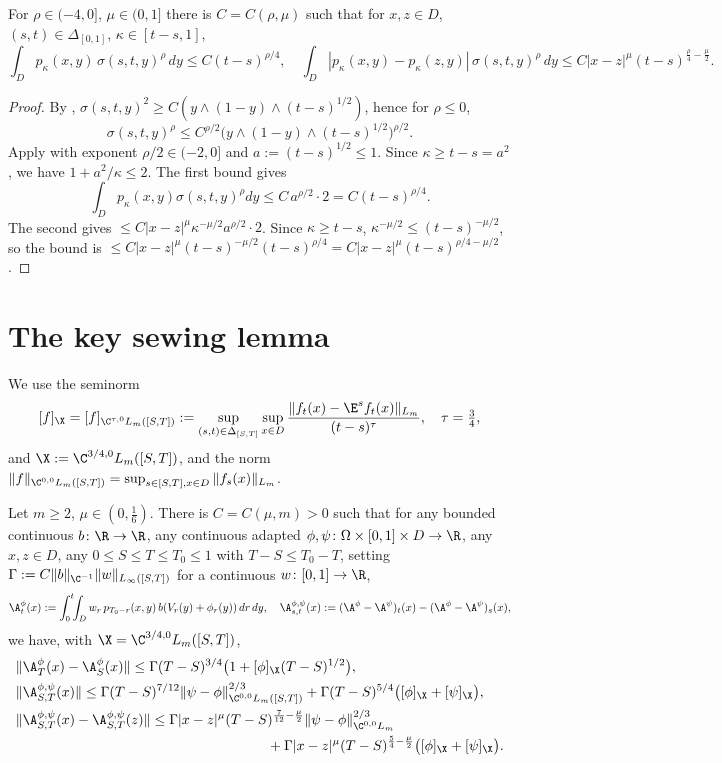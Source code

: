 \begin{corollary}\label{c:key}
For $\rho\in(-4,0]$, $\mu\in(0,1]$ there is $C=C(\rho,\mu)$ such that for $x,z\in D$, $(s,t)\in\Delta_{[0,1]}$, $\kappa\in[t-s,1]$,
\[
\int_D p_\kappa(x,y)\,\sigma(s,t,y)^\rho\,dy\le C(t-s)^{\rho/4},
\quad
\int_D|p_\kappa(x,y)-p_\kappa(z,y)|\,\sigma(s,t,y)^\rho\,dy\le C|x-z|^\mu(t-s)^{\frac\rho4-\frac\mu2}.
\]
\end{corollary}

\begin{proof}
By , $\sigma(s,t,y)^2\ge C(y\wedge(1-y)\wedge(t-s)^{1/2})$, hence for $\rho\le0$,
\[
\sigma(s,t,y)^\rho\le C^{\rho/2}\big(y\wedge(1-y)\wedge(t-s)^{1/2}\big)^{\rho/2}.
\]
Apply  with exponent $\rho/2\in(-2,0]$ and $a:=(t-s)^{1/2}\le 1$. Since $\kappa\ge t-s=a^2$, we have $1+a^2/\kappa\le 2$. The first bound gives
\[
\int_D p_\kappa(x,y)\sigma(s,t,y)^\rho dy\le C\,a^{\rho/2}\cdot 2=C(t-s)^{\rho/4}.
\]
The second gives $\le C|x-z|^\mu\kappa^{-\mu/2}a^{\rho/2}\cdot 2$. Since $\kappa\ge t-s$, $\kappa^{-\mu/2}\le (t-s)^{-\mu/2}$, so the bound is $\le C|x-z|^\mu(t-s)^{-\mu/2}(t-s)^{\rho/4}=C|x-z|^\mu(t-s)^{\rho/4-\mu/2}$.
\end{proof}

\section{The key sewing lemma}

We use the seminorm
\[
[f]_{\X}=[f]_{\C^{\tau,0}L_m([S,T])}:=\sup_{(s,t)\in\Delta_{[S,T]}}\sup_{x\in D}\frac{\|f_t(x)-\E^s f_t(x)\|_{L_m}}{(t-s)^\tau},\quad \tau=\tfrac34,
\]
and $\X:=\C^{3/4,0}L_m([S,T])$, and the norm $\|f\|_{\C^{0,0}L_m([S,T])}=\sup_{s\in[S,T],x\in D}\|f_s(x)\|_{L_m}$.

\begin{lemma}\label{L26}
Let $m\ge2$, $\mu\in(0,\tfrac16)$. There is $C=C(\mu,m)>0$ such that for any bounded continuous $b\colon\R\to\R$, any continuous adapted $\phi,\psi\colon\Omega\times[0,1]\times D\to\R$, any $x,z\in D$, any $0\le S\le T\le T_0\le1$ with $T-S\le T_0-T$, setting $\Gamma:=C\|b\|_{\C^{-1}}\|w\|_{L_\infty([S,T])}$ for a continuous $w\colon[0,1]\to\R$,
\[
\A^\phi_t(x):=\int_0^t\!\!\int_D w_r\,p_{T_0-r}(x,y)\,b(V_r(y)+\phi_r(y))\,dr\,dy,\quad
\A^{\phi,\psi}_{s,t}(x):=(\A^\phi-\A^\psi)_t(x)-(\A^\phi-\A^\psi)_s(x),
\]
we have, with $\X=\C^{3/4,0}L_m([S,T])$,
\begin{align}
&\|\A^\phi_T(x)-\A^\phi_S(x)\|\le \Gamma(T-S)^{3/4}\big(1+[\phi]_\X(T-S)^{1/2}\big),\label{eq:mr1}\\
&\|\A^{\phi,\psi}_{S,T}(x)\|\le \Gamma(T-S)^{7/12}\|\psi-\phi\|_{\C^{0,0}L_m([S,T])}^{2/3}+\Gamma(T-S)^{5/4}\big([\phi]_\X+[\psi]_\X\big),\label{eq:mr2}\\
&\|\A^{\phi,\psi}_{S,T}(x)-\A^{\phi,\psi}_{S,T}(z)\|\le \Gamma|x-z|^\mu(T-S)^{\frac7{12}-\frac\mu2}\|\psi-\phi\|_{\C^{0,0}L_m}^{2/3}\nonumber\\
&\hspace{18em}+\Gamma|x-z|^\mu(T-S)^{\frac54-\frac\mu2}\big([\phi]_\X+[\psi]_\X\big).\label{eq:mr3}
\end{align}
\end{lemma}

